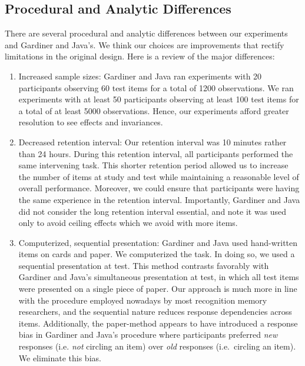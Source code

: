 \documentclass[english,,man]{apa6}
\begin{document}
\hypertarget{procedural-and-analytic-differences}{%
\subsection{Procedural and Analytic Differences}\label{procedural-and-analytic-differences}}

There are several procedural and analytic differences between our experiments and Gardiner and Java's. We think our choices are improvements that rectify limitations in the original design. Here is a review of the major differences:

\begin{enumerate}
\def\labelenumi{\arabic{enumi}.}
\item
  Increased sample sizes: Gardiner and Java ran experiments with 20 participants observing 60 test items for a total of 1200 observations. We ran experiments with at least 50 participants observing at least 100 test items for a total of at least 5000 observations. Hence, our experiments afford greater resolution to see effects and invariances.
\item
  Decreased retention interval: Our retention interval was 10 minutes rather than 24 hours. During this retention interval, all participants performed the same intervening task.
  This shorter retention period allowed us to increase the number of items at study and test while maintaining a reasonable level of overall performance. Moreover, we could ensure that participants were having the same experience in the retention interval.
  Importantly, Gardiner and Java did not consider the long retention interval essential, and note it was used only to avoid ceiling effects which we avoid with more items.
\item
  Computerized, sequential presentation: Gardiner and Java used hand-written items on cards and paper. We computerized the task. In doing so, we used a sequential presentation at test.
  This method contrasts favorably with Gardiner and Java's simultaneous presentation at test, in which all test items were presented on a single piece of paper.
  Our approach is much more in line with the procedure employed nowadays by most recognition memory researchers, and the sequential nature reduces response dependencies across items. Additionally, the paper-method appears to have introduced a response bias in Gardiner and Java's procedure where participants preferred \emph{new} responses (i.e. \emph{not} circling an item) over \emph{old} responses (i.e.~circling an item).
  We eliminate this bias.

\end{enumerate}
\end{document}
